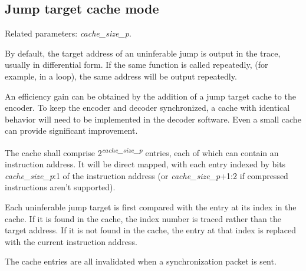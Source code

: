 \subsection{Jump target cache mode} \label{sec:jump-cache}

Related parameters: \textit{cache\_size\_p}.

By default, the target address of an uninferable jump is output in the trace, usually in differential
form.  If the same function is called repeatedly, (for example, in a loop), the same address will be output 
repeatedly.  

An efficiency gain can be obtained by the addition of a jump target cache to the encoder.  To keep
the encoder and decoder synchronized, a cache with identical behavior will need to be implemented in the 
decoder software.  Even a small cache can provide significant improvement.

The cache shall comprise 2\textsuperscript{\textit{cache\_size\_p}} entries, each of which can contain
an instruction address.  It will be direct mapped, with each entry indexed by bits \textit{cache\_size\_p}:1 
of the instruction address (or \textit{cache\_size\_p}+1:2 if compressed instructions aren't supported).   

Each uninferable jump target is first compared with the entry at its index in the cache.  If it is 
found in the cache, the index number is traced rather than the target address.  If it is not found in 
the cache, the entry at that index is replaced with the current instruction address.

The cache entries are all invalidated when a synchronization packet is sent.  


